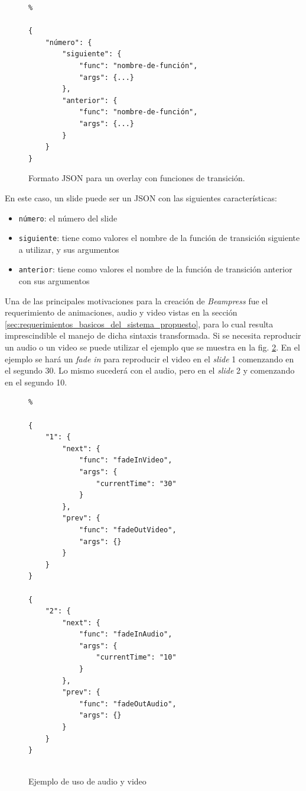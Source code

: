 		\begin{figure}[htb]%
			\begin{lstlisting}%

{
    "número": {
        "siguiente": {
            "func": "nombre-de-función",
            "args": {...}
        },
        "anterior": {
            "func": "nombre-de-función",
            "args": {...}
        }
    }
}	
			\end{lstlisting}
		\caption{
			Formato JSON para un overlay con funciones de transición. 
			\label{fig:json_format} }
		\end{figure}


	En este caso, un slide puede ser un JSON con las siguientes características:
	\begin{itemize}
		\item \texttt{número}: el número del slide
		\item \texttt{siguiente}: tiene como valores el nombre de la función de transición siguiente a utilizar, y sus argumentos
		\item \texttt{anterior}: tiene como valores el nombre de la función de transición anterior con sus argumentos
	\end{itemize}

	Una de las principales motivaciones para la creación de \textit{Beampress} fue el requerimiento de animaciones, audio y video vistas en la sección \ref{sec:requerimientos_basicos_del_sistema_propuesto}, para lo cual resulta imprescindible el manejo de dicha sintaxis transformada. Si se necesita reproducir un audio o un video se puede utilizar el ejemplo que se muestra en la fig. \ref{fig:ex_audio_video_syntax}. En el ejemplo se hará un \textit{fade in} para reproducir el video en el \textit{slide} 1 comenzando en el segundo 30. Lo mismo sucederá con el audio, pero en el \textit{slide} 2 y comenzando en el segundo 10.


	\begin{figure}[htb]%
		\begin{lstlisting}%

{
    "1": {
        "next": {
            "func": "fadeInVideo",
            "args": {
                "currentTime": "30"
            }
        },
        "prev": {
            "func": "fadeOutVideo",
            "args": {}
        }
    }
}

{
    "2": {
        "next": {
            "func": "fadeInAudio",
            "args": {
                "currentTime": "10"
            }
        },
        "prev": {
            "func": "fadeOutAudio",
            "args": {}
        }
    }
}
				
		\end{lstlisting}
		\caption{Ejemplo de uso de audio y video} 
			\label{fig:ex_audio_video_syntax}
		\end{figure}

